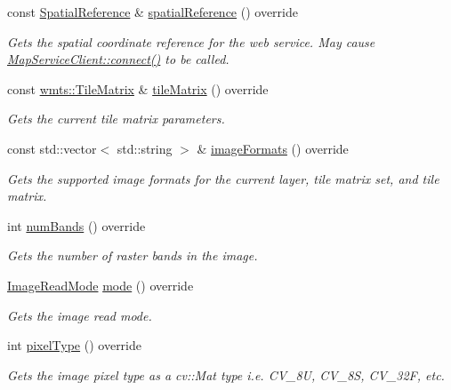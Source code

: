 \begin{DoxyCompactItemize}
const \hyperlink{classdg_1_1deepcore_1_1imagery_1_1_spatial_reference}{Spatial\+Reference} \& \hyperlink{classdg_1_1deepcore_1_1imagery_1_1_map_box_client_a5206bbd6192373b345bad4d8176d64e3}{spatial\+Reference} () override
\begin{DoxyCompactList}\small\item\em Gets the spatial coordinate reference for the web service. May cause \hyperlink{group___imagery_module_ga5e5f58c725cafba7966936f688a6ade0}{Map\+Service\+Client\+::connect()} to be called. \end{DoxyCompactList}\item 
const \hyperlink{structdg_1_1deepcore_1_1imagery_1_1wmts_1_1_tile_matrix}{wmts\+::\+Tile\+Matrix} \& \hyperlink{classdg_1_1deepcore_1_1imagery_1_1_map_box_client_a5426c8d2965597bef6bc049d2ce3c2dc}{tile\+Matrix} () override
\begin{DoxyCompactList}\small\item\em Gets the current tile matrix parameters. \end{DoxyCompactList}\item 
const std\+::vector$<$ std\+::string $>$ \& \hyperlink{classdg_1_1deepcore_1_1imagery_1_1_map_box_client_a37567713011802bdf418df046d5ac8b7}{image\+Formats} () override
\begin{DoxyCompactList}\small\item\em Gets the supported image formats for the current layer, tile matrix set, and tile matrix. \end{DoxyCompactList}\item 
int \hyperlink{classdg_1_1deepcore_1_1imagery_1_1_map_box_client_afd9e6b51a7e49ff4814351ce57a3a97b}{num\+Bands} () override
\begin{DoxyCompactList}\small\item\em Gets the number of raster bands in the image. \end{DoxyCompactList}\item 
\hyperlink{group___imagery_module_ga1db94ae833853b71ed501bb1ea8c1c24}{Image\+Read\+Mode} \hyperlink{classdg_1_1deepcore_1_1imagery_1_1_map_box_client_a73b020a3bff3007fd139850b58095904}{mode} () override
\begin{DoxyCompactList}\small\item\em Gets the image read mode. \end{DoxyCompactList}\item 
int \hyperlink{classdg_1_1deepcore_1_1imagery_1_1_map_box_client_a359e62eba94444a18ec2b9e1d6ee79b3}{pixel\+Type} () override
\begin{DoxyCompactList}\small\item\em Gets the image pixel type as a cv\+::\+Mat type i.\+e. C\+V\+\_\+8U, C\+V\+\_\+8S, C\+V\+\_\+32F, etc. \end{DoxyCompactList}\item 

\end{DoxyCompactItemize}
